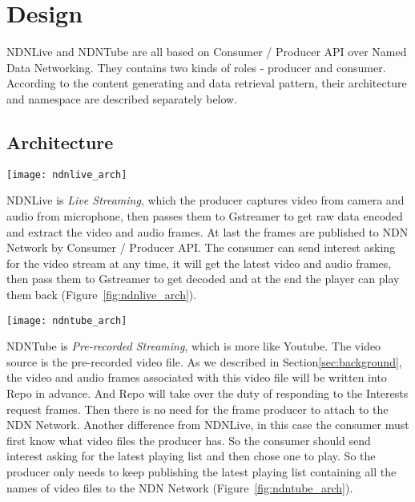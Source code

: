 \vspace{0.3cm}
\section{Design} %
\label{sec:arch}
NDNLive and NDNTube are all based on Consumer / Producer API over Named Data Networking. They contains two kinds of roles - producer and consumer. According to the content generating and data retrieval pattern, their architecture and namespace are described separately below. 

\subsection{Architecture}
\begin{figure*}[htbp]
  \centering
  \texttt{[image: ndnlive\_arch]}
  \caption{NDNLive Architecture}
  \label{fig:ndnlive_arch}
\end{figure*}

NDNLive is \textit{Live Streaming}, which the producer captures video from camera and audio from microphone, then passes them to Gstreamer to get raw data encoded and extract the video and audio frames. At last the frames are published to NDN Network by Consumer / Producer API. The consumer can send interest asking for the video stream at any time, it will get the latest video and audio frames, then pass them to Gstreamer to get decoded and at the end the player can play them back (Figure~\ref{fig:ndnlive_arch}). 

\begin{figure*}[htbp]
  \centering
  \texttt{[image: ndntube\_arch]}
  \caption{NDNTube Architecture}
  \label{fig:ndntube_arch}
\end{figure*}
NDNTube is \textit{Pre-recorded Streaming}, which is more like Youtube. The video source is the pre-recorded video file. As we described in Section\ref{sec:background}, the video and audio frames associated with this video file will be written into Repo in advance. And Repo will take over the duty of responding to the Interests request frames. Then there is no need for the frame producer to attach to the NDN Network. Another difference from NDNLive, in this case the consumer must first know what video files the producer has. So the consumer should send interest asking for the latest playing list and then chose one to play. So the producer only needs to keep publishing the latest playing list containing all the names of video files to the NDN Network (Figure~\ref{fig:ndntube_arch}).

